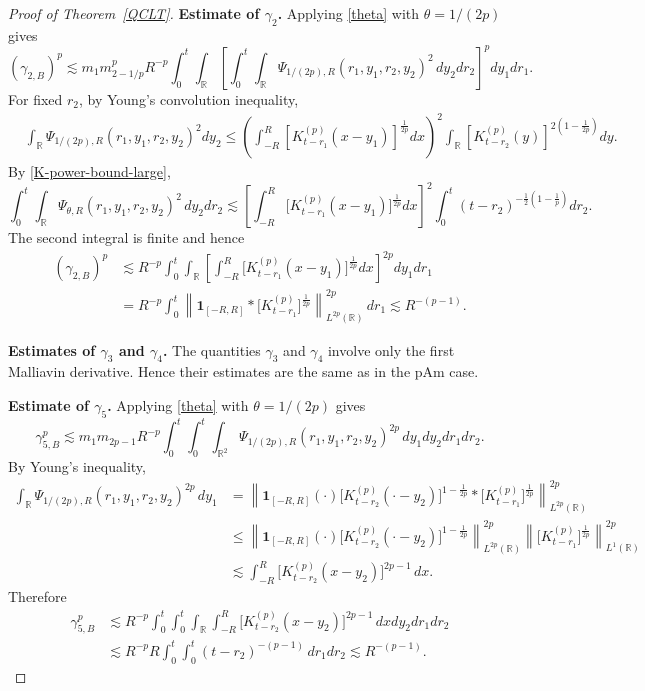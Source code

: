 \documentclass[12pt]{article}
\def\bR{\mathbb{R}}
\begin{document}
\begin{proof}[ Proof of Theorem~\ref{QCLT}]
\medskip
{\bf Estimate of $\gamma_2$.}  Applying \eqref{theta} with
$\theta=1/(2p)$ gives
\begin{equation}
\label{gamma2-B}
(\gamma_{2,B})^p \lesssim m_1m_{2-1/p}^p
R^{-p}
\int_0^t\int_{\bR}
\left[
\int_0^t\int_{\bR}
\Psi_{1/(2p),R}(r_1,y_1,r_2,y_2)^2
\,dy_2dr_2
\right]^p
dy_1dr_1 .
\end{equation}
For fixed $r_2$, by Young's convolution inequality,
\begin{align*}
&\int_{\bR}
\Psi_{1/(2p),R}(r_1,y_1,r_2,y_2)^2
dy_2 \le
\left(
\int_{-R}^{R}
[K^{(p)}_{t-r_1}(x-y_1)]^{\frac{1}{2p}} dx
\right)^2
\int_{\bR}
[K^{(p)}_{t-r_2}(y)]^{2(1-\frac{1}{2p})}dy .
\end{align*}
By \eqref{K-power-bound-large},
\begin{equation*}
    \int_0^t\int_{\bR}
\Psi_{\theta,R}(r_1,y_1,r_2,y_2)^2\,dy_2dr_2
\lesssim
\left[
\int_{-R}^{R}
\big[K_{t-r_1}^{(p)}(x-y_1)\big]^{\frac{1}{2p}} dx
\right]^2 \int_0^t
(t-r_2)^{-\frac12(1-\frac1p)}dr_2.
\end{equation*}
The second integral is finite and hence 
\begin{align*}
(\gamma_{2,B})^p
&\lesssim
R^{-p}
\int_0^t\int_{\bR}
\left[
\int_{-R}^{R}
\big[K_{t-r_1}^{(p)}(x-y_1)\big]^{\frac{1}{2p}} dx
\right]^{2p}
dy_1dr_1\\
& =
R^{-p}
\int_0^t
\left\|
\mathbf 1_{[-R,R]}*
\big[K_{t-r_1}^{(p)}\big]^{\frac1{2p}}
\right\|_{L^{2p}(\bR)}^{2p}
\,dr_1   \lesssim R^{-(p-1)}.
\end{align*}

{\bf Estimates of $\gamma_3$ and $\gamma_4$.}
The quantities $\gamma_3$ and $\gamma_4$ involve only the first Malliavin
derivative. Hence their estimates are the same as in the pAm case. 

\medskip
{\bf Estimate of $\gamma_5$.}  Applying \eqref{theta} with
$\theta=1/(2p)$ gives
\begin{equation}
\label{gamma5}
\gamma_{5,B}^p
\lesssim
m_1m_{2p-1}R^{-p}
\int_0^t\int_0^t\int_{\bR^2}
\Psi_{1/(2p),R}(r_1,y_1,r_2,y_2)^{2p}
\,dy_1dy_2dr_1dr_2 .
\end{equation}
 By Young's inequality,
\begin{align*}
\int_{\bR}
\Psi_{1/(2p),R}(r_1,y_1,r_2,y_2)^{2p}\,dy_1 &=\left\|
\mathbf 1_{[-R,R]}(\cdot)
\big[K_{t-r_2}^{(p)}(\cdot-y_2)\big]^{1-\frac1{2p}}
*
\big[K_{t-r_1}^{(p)}\big]^{\frac1{2p}}
\right\|_{L^{2p}(\bR)}^{2p} \\
&\le  \left\|
\mathbf 1_{[-R,R]}(\cdot)
\big[K_{t-r_2}^{(p)}(\cdot-y_2)\big]^{1-\frac1{2p}}
\right\|_{L^{2p}(\bR)}^{2p}
\left\|
\big[K_{t-r_1}^{(p)}\big]^{\frac1{2p}}
\right\|_{L^1(\bR)}^{2p}\\
&\lesssim \int_{-R}^{R}
\big[K_{t-r_2}^{(p)}(x-y_2)\big]^{2p-1}\,dx .
\end{align*}
Therefore
\begin{align*}
\gamma_{5,B}^p &\lesssim R^{-p} \int_0^t\int_0^t\int_{\bR}\int_{-R}^{R}
\big[K_{t-r_2}^{(p)}(x-y_2)\big]^{2p-1}
\,dxdy_2dr_1dr_2 \\
&\lesssim R^{-p} R \int_0^t\int_0^t
(t-r_2)^{-(p-1)}
\,dr_1dr_2  \lesssim R^{-(p-1)}.
\end{align*}


\end{proof}
\end{document}
